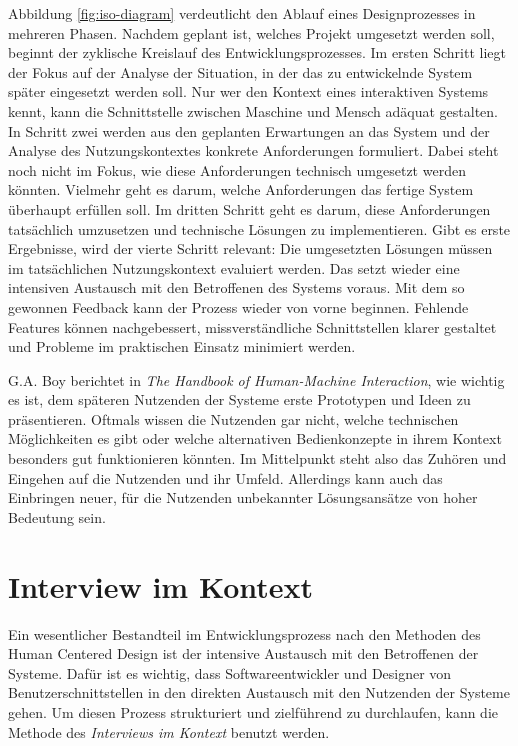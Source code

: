 Abbildung \ref{fig:iso-diagram} verdeutlicht den Ablauf eines Designprozesses in
mehreren Phasen. Nachdem geplant ist, welches Projekt umgesetzt werden soll,
beginnt der zyklische Kreislauf des Entwicklungsprozesses. Im ersten Schritt
liegt der Fokus auf der Analyse der Situation, in der das zu entwickelnde
System später eingesetzt werden soll. Nur wer den Kontext eines interaktiven
Systems kennt, kann die Schnittstelle zwischen Maschine und Mensch adäquat
gestalten. In Schritt zwei werden aus den geplanten Erwartungen an das System und der Analyse des Nutzungskontextes konkrete Anforderungen formuliert. Dabei steht noch nicht im Fokus, wie diese Anforderungen
technisch umgesetzt werden könnten. Vielmehr geht es darum, welche
Anforderungen das fertige System überhaupt erfüllen soll. Im dritten Schritt
geht es darum, diese Anforderungen tatsächlich umzusetzen und technische
Lösungen zu implementieren. Gibt es erste Ergebnisse, wird der vierte Schritt
relevant: Die umgesetzten Lösungen müssen im tatsächlichen Nutzungskontext
evaluiert werden. Das setzt wieder eine intensiven Austausch mit den
Betroffenen des Systems voraus. Mit dem so gewonnen Feedback kann der Prozess
wieder von vorne beginnen. Fehlende Features können nachgebessert,
missverständliche Schnittstellen klarer gestaltet und Probleme im praktischen
Einsatz minimiert werden\cite{ISO9241}.

G.A. Boy berichtet in \textit{The Handbook of Human-Machine Interaction}, wie
wichtig es ist, dem späteren Nutzenden der Systeme erste Prototypen und Ideen zu
präsentieren. Oftmals wissen die Nutzenden gar nicht, welche technischen
Möglichkeiten es gibt oder welche alternativen Bedienkonzepte in ihrem Kontext
besonders gut funktionieren könnten. Im Mittelpunkt steht also das Zuhören und Eingehen auf die
Nutzenden und ihr Umfeld. Allerdings kann auch das Einbringen neuer, für die Nutzenden
unbekannter Lösungsansätze von hoher Bedeutung sein\cite{HMI-HCD}.

\section{Interview im Kontext}

Ein wesentlicher Bestandteil im Entwicklungsprozess nach den Methoden des Human
Centered Design ist der intensive Austausch mit den Betroffenen der Systeme.
Dafür ist es wichtig, dass Softwareentwickler und Designer von
Benutzerschnittstellen in den direkten Austausch mit den Nutzenden der Systeme
gehen. Um diesen Prozess strukturiert und zielführend zu durchlaufen, kann
die Methode des \textit{Interviews im Kontext} benutzt werden.

